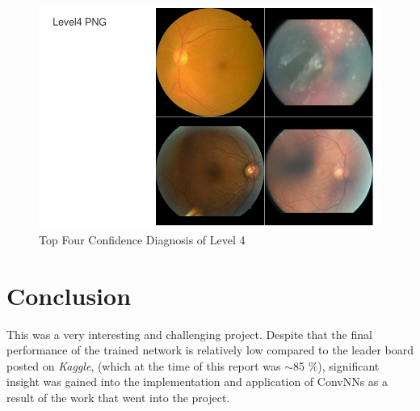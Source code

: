 \documentclass[letterpaper,12pt]{article}
\begin{document}
\begin{figure}[htbp]
\begin{center}
\includegraphics[scale=0.5]{images/Level4_Top4.png}
\caption{Top Four Confidence Diagnosis of Level 4}
\label{DR4}
\end{center}
\end{figure}

\newpage
\section{Conclusion}

This was a very interesting and challenging project. Despite that the final performance of the trained network is relatively low compared to the leader board posted on \textit{Kaggle}, (which at the time of this report was $\sim$85 $\%$), significant insight was gained into the implementation and application of ConvNNs as a result of the work that went into the project.

\newpage


\end{document}
